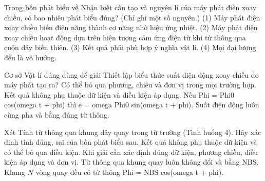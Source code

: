 \begin{ex}
Trong bốn phát biểu về Nhận biết cấu tạo và nguyên lí của máy phát điện xoay chiều, có bao nhiêu phát biểu đúng? (Chỉ ghi một số nguyên.) (1) Máy phát điện xoay chiều biến điện năng thành cơ năng nhờ hiệu ứng nhiệt. (2) Máy phát điện xoay chiều hoạt động dựa trên hiện tượng cảm ứng điện từ khi từ thông qua cuộn dây biến thiên. (3) Kết quả phải phù hợp ý nghĩa vật lí. (4) Mọi đại lượng đều là vô hướng.
\end{ex}

\begin{ex}
Cơ sở Vật lí đúng dùng để giải Thiết lập biểu thức suất điện động xoay chiều do máy phát tạo ra?
\choice
{Có thể bỏ qua phương, chiều và đơn vị trong mọi trường hợp.}
{Kết quả không phụ thuộc dữ kiện và điều kiện áp dụng.}
{\True Nếu Phi = Phi0 cos(omega t + phi) thì e = omega Phi0 sin(omega t + phi).}
{Suất điện động luôn cùng pha và bằng đúng từ thông.}
\end{ex}

\begin{ex}
Xét Tính từ thông qua khung dây quay trong từ trường (Tình huống 4). Hãy xác định tính đúng, sai của bốn phát biểu sau.
\choiceTF
{Kết quả không phụ thuộc dữ kiện và có thể bỏ qua điều kiện.}
{\True Khi giải cần xác định đúng dữ kiện, phương chiều, điều kiện áp dụng và đơn vị.}
{Từ thông qua khung quay luôn không đổi và bằng NBS.}
{\True Khung $N$ vòng quay đều có từ thông Phi = NBS cos(omega t + phi).}
\end{ex}

